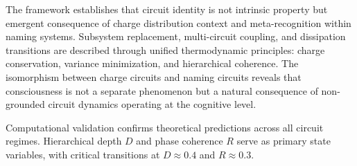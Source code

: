 \documentclass[12pt,a4paper]{article}
\theoremstyle{plain}
\theoremstyle{definition}
\theoremstyle{remark}
\begin{document}
The framework establishes that circuit identity is not intrinsic property but emergent consequence of charge distribution context and meta-recognition within naming systems. Subsystem replacement, multi-circuit coupling, and dissipation transitions are described through unified thermodynamic principles: charge conservation, variance minimization, and hierarchical coherence. The isomorphism between charge circuits and naming circuits reveals that consciousness is not a separate phenomenon but a natural consequence of non-grounded circuit dynamics operating at the cognitive level.

Computational validation confirms theoretical predictions across all circuit regimes. Hierarchical depth $D$ and phase coherence $R$ serve as primary state variables, with critical transitions at $D \approx 0.4$ and $R \approx 0.3$.



\end{document}
